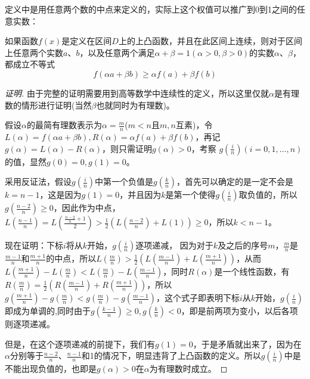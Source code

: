 定义中是用任意两个数的中点来定义的，实际上这个权值可以推广到0到1之间的任意实数：
\begin{theorem}
  \label{theorem:convexity-function-with-weight}
  如果函数$f(x)$是定义在区间$D$上的上凸函数，并且在此区间上连续，则对于区间上任意两个实数$a$、$b$，以及任意两个满足$\alpha + \beta = 1(\alpha >0, \beta>0)$的实数$\alpha$、$\beta$，都成立不等式
  \begin{equation}
    \label{eq:convexity-function-with-weight}
    f(\alpha a + \beta b) \geqslant \alpha f(a) + \beta f(b) 
  \end{equation}
\end{theorem}

\begin{proof}[证明]
  由于完整的证明需要用到高等数学中连续性的定义，所以这里仅就$\alpha$是有理数的情形进行证明(当然$\beta$也就同时为有理数)。

假设$\alpha$的最简有理数表示为$\alpha=\frac{m}{n}$($m<n$且$m,n$互素)，令$L(\alpha)=f(\alpha a + \beta b), R(\alpha)=\alpha f(a)+\beta f(b)$，再记 $g(\alpha) = L(\alpha) - R(\alpha)$，则只需证明$g(\alpha)>0$，考察 $ g(\frac{i}{n})(i=0,1,\ldots,n)$的值，显然$g(0)=0, g(1)=0$。

采用反证法，假设$g(\frac{i}{n})$中第一个负值是$g(\frac{k}{n})$，首先可以确定的是一定不会是$k=n-1$，这是因为$g(1)=0$，并且因为$k$是第一个使得$g(\frac{i}{n})$取负值的，所以$g(\frac{n-2}{n}) \geqslant 0$，因此作为中点，$L(\frac{n-1}{n})=L(\frac{\frac{n-2}{n}+1}{2})>\frac{1}{2}\left(L(\frac{n-2}{n}) + L(1)\right) \geqslant 0$，所以$k<n-1$。

现在证明：下标$i$将从$k$开始，$g(\frac{i}{n})$逐项递减， 因为对于$k$及之后的序号$m$，$\frac{m}{n}$是$\frac{m-1}{n}$和$\frac{m+1}{n}$的中点，所以$L\left( \frac{m}{n} \right) > \frac{1}{2} \left( L(\frac{m-1}{n}) + L(\frac{m+1}{n}) \right)$，从而$L(\frac{m+1}{n})-L(\frac{m}{n})<L(\frac{m}{n})-L(\frac{m-1}{n})$，同时$R(\alpha)$是一个线性函数，有$R(\frac{m}{n})=\frac{1}{2}\left( R(\frac{m-1}{n})+R(\frac{m+1}{n}) \right)$，所以$g(\frac{m+1}{n})-g(\frac{m}{n})<g(\frac{m}{n})-g(\frac{m-1}{n})$，这个式子即表明下标$i$从$k$开始，$g(\frac{i}{n})$即成为单调的,同时由于$g(\frac{k-1}{n}) \geqslant 0,g(\frac{k}{n})<0$，即是前两项为变小，以后各项则逐项递减。

但是，在这个逐项递减的前提下，我们有$g(1)=0$，于是矛盾就出来了，因为在$\alpha$分别等于$\frac{n-2}{n}$、$\frac{n-1}{n}$和1的情况下，明显违背了上凸函数的定义。所以$g(\frac{i}{n})$中是不能出现负值的，也即是$g(\alpha)>0$在$\alpha$为有理数时成立。
\end{proof}

